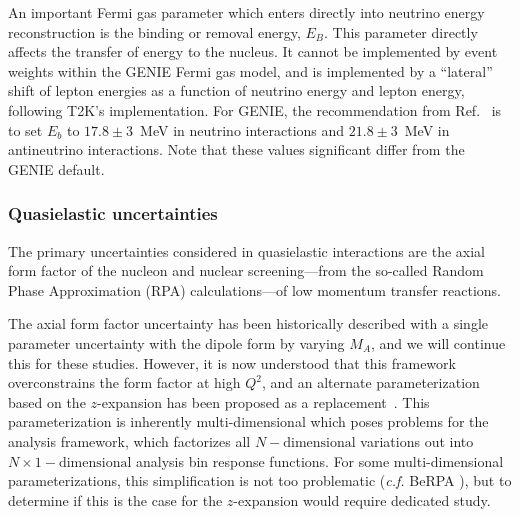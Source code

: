 An important Fermi gas parameter which enters directly into neutrino energy reconstruction is the binding or removal energy, $E_B$.  This parameter directly affects the transfer of energy to the nucleus.  It cannot be implemented by event weights within the GENIE Fermi gas model, and is implemented by a ``lateral'' shift of lepton energies as a function of neutrino energy and lepton energy, following T2K's implementation. For GENIE, the recommendation from Ref.~\cite{bodek_eb} is to set $E_b$ to $17.8\pm 3$~MeV in neutrino interactions and $21.8\pm 3$~MeV in antineutrino interactions.  Note that these values significant differ from the GENIE default.%

\subsubsection{Quasielastic uncertainties}
The primary uncertainties considered in quasielastic interactions are the axial form factor of the nucleon and nuclear screening---from the so-called Random Phase Approximation (RPA) calculations---of low momentum transfer reactions.

The axial form factor uncertainty has been historically described with a single parameter uncertainty with the dipole form by varying $M_A$, and we will continue this for these studies.  However, it is now understood that this framework overconstrains the form factor at high $Q^2$, and an alternate parameterization based on the $z$-expansion has been proposed as a replacement~\cite{Meyer:2016oeg}.  This parameterization is inherently multi-dimensional which poses problems for the analysis framework, which factorizes all $N-\textrm{dimensional}$ variations out into $N\times{}1-\textrm{dimensional}$ analysis bin response functions. For some multi-dimensional parameterizations, this simplification is not too problematic (\textit{c.f.} BeRPA \cite{}), but to determine if this is the case for the $z$-expansion would require dedicated study.

